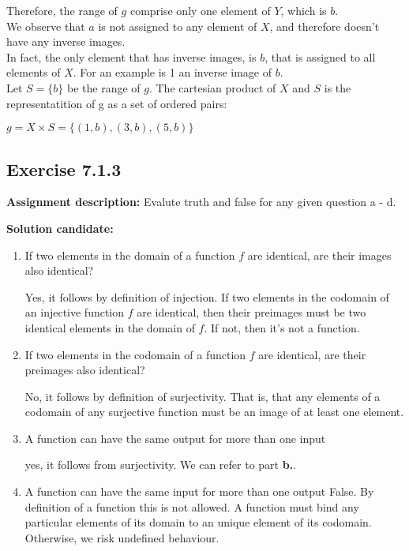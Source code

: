 \documentclass{report}
\newcommand{\cent}[1]{\begin{center}#1\end{center}}
\newcommand{\assignmentDescription}{\textbf{Assignment description: }}
\newcommand{\solution}{\textbf{Solution candidate: }}
\newcommand{\QED}{\boxed{}}
\newcommand{\Exercise}[1]{\subsection{Exercise #1}}
\newcommand{\defaultEnumerateLabel}{\textbf{\alph*.}}
\begin{document}
 	Therefore, the range of $g$ comprise only one element of $Y$, which is $b$.\\
 	
 	We observe that $a$ is not assigned to any element of $X$, and therefore doesn't have any inverse images.\\
 	
 	In fact, the only element that has inverse images, is $b$, that is assigned to all elements of $X$. For an example is 1 an inverse image of $b$. \\
 	
 	Let $S = \{b\}$ be the range of $g$. The cartesian product of $X$ and $S$ is the representatition of g as a set of ordered pairs:
 	
 	\cent{$g = X \times S = \{(1,b),(3,b),(5,b)\}$}
 	
 	\QED
 	
 	\Exercise{7.1.3}
 	\assignmentDescription
 	Evalute truth and false for any given question a - d.
 	
 	\solution
 	
 	\begin{enumerate}[label=\defaultEnumerateLabel]
 		\item If two elements in the domain of a function $f$ are identical, are their images also identical?
 		
 		Yes, it follows by definition of injection. If two elements in the codomain of an injective  function $f$ are identical, then their preimages must be two identical elements in the domain of $f$. If not, then it's not a function.
 		
 		\item If two elements in the codomain of a function $f$ are identical, are their preimages also identical?
 		
 		No, it follows by definition of surjectivity. That is, that any elements of a codomain of any surjective function must be an image of at least one element. 
 		
 		\item A function can have the same output for more than one input
 		
 		yes, it follows from surjectivity. We can refer to part \textbf{b.}.
 		
 		\item A function can have the same input for more than one output
 		False. By definition of a function this is not allowed. A function must bind any particular elements of its domain to an unique element of its codomain. Otherwise, we risk undefined behaviour.
 	\end{enumerate}
 
\end{document}
